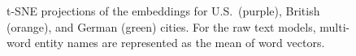 \begin{figure}[t]
\caption{t-SNE projections of the embeddings for U.S.\ (purple), British (orange), and German (green) cities. For the raw text models, multi-word entity names are represented as the mean of word vectors.}
\label{fig:clust}
\end{figure}

